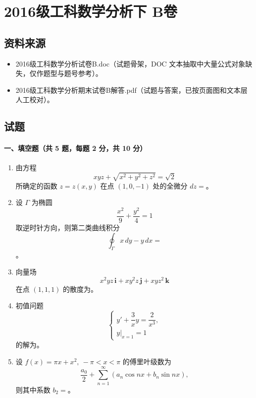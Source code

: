 \section{2016级工科数学分析下 B卷}

\subsection{资料来源}
\begin{itemize}
  \item 2016级工科数学分析试卷B.doc（试题骨架，DOC 文本抽取中大量公式对象缺失，仅作题型与题号参考）。
  \item 2016级工科数学分析期末试卷B解答.pdf（试题与答案，已按页面图和文本层人工校对）。
\end{itemize}

\subsection{试题}

\paragraph*{一、填空题（共 5 题，每题 2 分，共 10 分）}
\begin{enumerate}
  \item 由方程
  \[
    xyz+\sqrt{x^2+y^2+z^2}=\sqrt2
  \]
  所确定的函数 $z=z(x,y)$ 在点 $(1,0,-1)$ 处的全微分 $dz=$\underline{\hspace{4cm}}。

  \item 设 $\Gamma$ 为椭圆
  \[
    \frac{x^2}{9}+\frac{y^2}{4}=1
  \]
  取逆时针方向，则第二类曲线积分
  \[
    \oint_\Gamma x\,dy-y\,dx=
  \]
  \underline{\hspace{4cm}}。

  \item 向量场
  \[
    x^2yz\,\mathbf i+xy^2z\,\mathbf j+xyz^2\,\mathbf k
  \]
  在点 $(1,1,1)$ 的散度为\underline{\hspace{4cm}}。

  \item 初值问题
  \[
    \begin{cases}
      y'+\dfrac{3}{x}y=\dfrac{2}{x^3},\\
      y|_{x=1}=1
    \end{cases}
  \]
  的解为\underline{\hspace{4cm}}。

  \item 设 $f(x)=\pi x+x^2,\ -\pi<x<\pi$ 的傅里叶级数为
  \[
    \frac{a_0}{2}+\sum_{n=1}^{\infty}(a_n\cos nx+b_n\sin nx),
  \]
  则其中系数 $b_2=$\underline{\hspace{4cm}}。
\end{enumerate}

